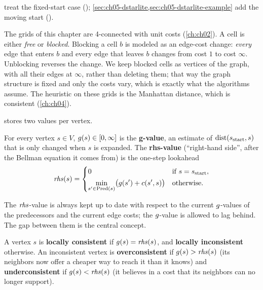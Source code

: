  treat the fixed-start case (\lpastar);
\cref{sec:ch05-dstarlite,sec:ch05-dstarlite-example} add the moving start (\dstarlite).

The grids of this chapter are 4-connected with unit costs (\cref{ch:ch02}). A cell is
either \emph{free} or \emph{blocked}. Blocking a cell $b$ is modeled as an edge-cost
change: \emph{every} edge that enters $b$ and every edge that leaves $b$ changes from
cost $1$ to cost $\infty$. Unblocking reverses the change. We keep blocked cells as vertices of the graph, with all their edges at
$\infty$, rather than deleting them; that way the graph structure is fixed and only the
costs vary, which is exactly what the algorithms assume. The heuristic on these grids is
the Manhattan distance, which is consistent (\cref{ch:ch04}).

\lpastar stores two values per vertex.

\begin{definition}
\label{def:ch05-rhs}
For every vertex $s\in V$, $g(s)\in[0,\infty]$ is the \textbf{g-value},
an estimate of $\operatorname{dist}(s_{\mathrm{start}},s)$ that is only changed when $s$ is expanded.
The \textbf{rhs-value} (``right-hand side'',
after the Bellman equation it comes from) is the one-step lookahead
\begin{equation}
\label{eq:ch05-rhs}
\mathit{rhs}(s) =
\begin{cases}
0 & \text{if } s = s_{\mathrm{start}},\\[2pt]
\displaystyle\min_{s'\in\operatorname{Pred}(s)} \bigl(g(s') + c(s',s)\bigr) & \text{otherwise.}
\end{cases}
\end{equation}
\end{definition}

The $\mathit{rhs}$-value is always kept up to date with respect to the current $g$-values
of the predecessors and the current edge costs; the $g$-value is allowed to lag
behind. The gap between them is the central concept.

\begin{definition}
\label{def:ch05-consistency}
A vertex $s$ is \textbf{locally consistent} if $g(s) = \mathit{rhs}(s)$, and \textbf{locally inconsistent} otherwise. An
inconsistent vertex is \textbf{overconsistent} if
$g(s) > \mathit{rhs}(s)$ (its neighbors now offer a cheaper way to reach it than it
knows) and \textbf{underconsistent} if
$g(s) < \mathit{rhs}(s)$ (it believes in a cost that its neighbors can no longer
support).
\end{definition}

